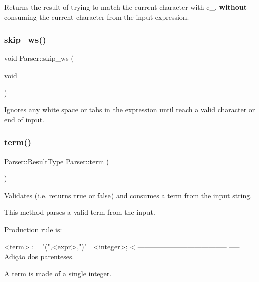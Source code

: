 Returns the result of trying to match the current character with c\+\_\+, {\bfseries without} consuming the current character from the input expression. 

\mbox{\label{classParser_a35da81bd369bab816b71418736184d5d}} 
\subsubsection{\texorpdfstring{skip\+\_\+ws()}{skip\_ws()}}
{\footnotesize\ttfamily void Parser\+::skip\+\_\+ws (\begin{DoxyParamCaption}\item[{void}]{ }\end{DoxyParamCaption})\hspace{0.3cm}{\ttfamily [private]}}



Ignores any white space or tabs in the expression until reach a valid character or end of input. 

\mbox{\label{classParser_a82f4cbee572a5b8305368820525603bd}} 
\subsubsection{\texorpdfstring{term()}{term()}}
{\footnotesize\ttfamily \hyperlink{structParser_1_1ResultType}{Parser\+::\+Result\+Type} Parser\+::term (\begin{DoxyParamCaption}{ }\end{DoxyParamCaption})\hspace{0.3cm}{\ttfamily [private]}}



Validates (i.\+e. returns true or false) and consumes a term from the input string. 

This method parses a valid term from the input.

Production rule is\+: 
\begin{DoxyCode}
<\hyperlink{classParser_a82f4cbee572a5b8305368820525603bd}{term}> := \textcolor{stringliteral}{"("},<\hyperlink{classParser_a6429f38abf0207bc14d64bacc399b3f9}{expr}>,\textcolor{stringliteral}{")"} | <\hyperlink{classParser_ab6b91c4e4b8bacb7d0eefca5ae9ffce6}{integer}>;               < --------------------------------------
      ----- Adição dos parenteses.
\end{DoxyCode}
 A term is made of a single integer.


